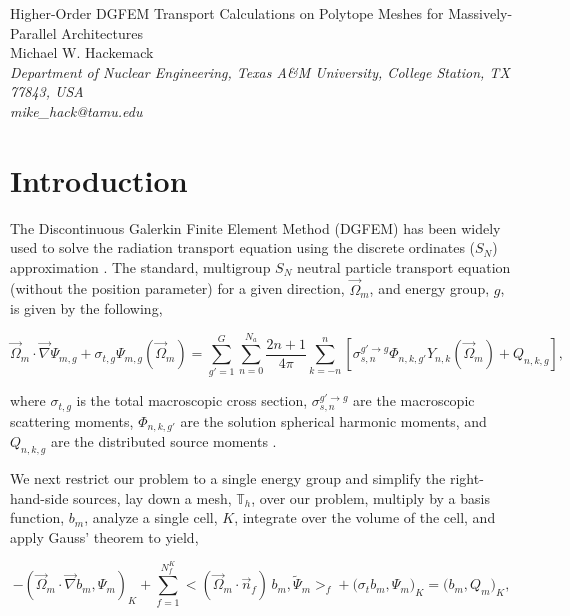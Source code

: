 \documentclass[11pt]{article}
\begin{document}
\begin{center}
{\Large Higher-Order DGFEM Transport Calculations on Polytope Meshes for Massively-Parallel Architectures}\\[8mm]
{Michael W. Hackemack} \\[2mm]
{\em \small Department of Nuclear Engineering, Texas A\&M University, College Station, TX 77843, USA} \\[1mm]
{\em mike\_hack@tamu.edu} \\[6mm]
\end{center}

\section{Introduction}
\label{sec::intro}

The Discontinuous Galerkin Finite Element Method (DGFEM) has been widely used to solve the radiation transport equation using the discrete ordinates ($S_N$) approximation \cite{reed1973triplet}. The standard, multigroup $S_N$ neutral particle transport equation (without the position parameter) for a given direction, $\vec{\Omega}_m$, and energy group, $g$, is given by the following,

\begin{equation}
\label{eq::trans_eq}
\vec{\Omega}_m \cdot \vec{\nabla} \Psi_{m,g} + \sigma_{t,g} \Psi_{m,g} (\vec{\Omega}_m) = \sum_{g'=1}^G \sum_{n=0}^{N_a} \frac{2n+1}{4 \pi} \sum_{k=-n}^{n} \left[ \sigma_{s,n}^{g' \rightarrow g}  \Phi_{n,k,g'} Y_{n,k} (\vec{\Omega}_m) + Q_{n,k,g}  \right] ,
\end{equation}

\noindent where $\sigma_{t,g}$ is the total macroscopic cross section, $\sigma_{s,n}^{g' \rightarrow g}$ are the macroscopic scattering moments, $\Phi_{n,k,g'}$ are the solution spherical harmonic moments, and $Q_{n,k,g}$ are the distributed source moments \cite{lewis1984computational}. 

We next restrict our problem to a single energy group and simplify the right-hand-side sources, lay down a mesh, $\mathbb{T}_h$, over our problem, multiply by a basis function, $b_m$, analyze a single cell, $K$, integrate over the volume of the cell, and apply Gauss' theorem to yield,

\begin{equation}
\label{eq::disc_trans_eq_cellK}
- \left( \vec{\Omega}_m \cdot  \vec{\nabla} b_m, \Psi_{m} \right)_{K} + \sum_{f=1}^{N_f^K} \Big< ( \vec{\Omega}_m \cdot \vec{n}_f ) \, b_m, \tilde{\Psi}_m  \Big>_{f}  + \Big(  \sigma_{t} b_m ,   \Psi_{m} \Big)_{K} = \Big(  b_m ,   Q_m \Big)_{K} ,
\end{equation}
\end{document}
